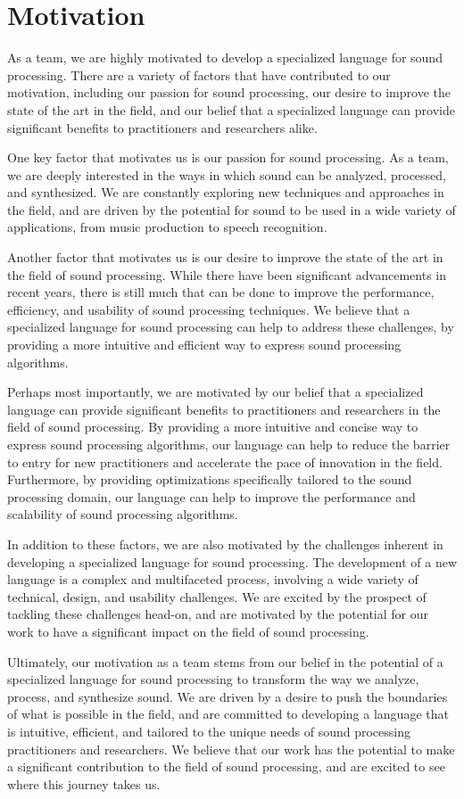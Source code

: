 \section{Motivation} 
As a team, we are highly motivated to develop a specialized language for sound processing. There are a variety of factors that have contributed to our motivation, including our passion for sound processing, our desire to improve the state of the art in the field, and our belief that a specialized language can provide significant benefits to practitioners and researchers alike.

One key factor that motivates us is our passion for sound processing. As a team, we are deeply interested in the ways in which sound can be analyzed, processed, and synthesized. We are constantly exploring new techniques and approaches in the field, and are driven by the potential for sound to be used in a wide variety of applications, from music production to speech recognition.

Another factor that motivates us is our desire to improve the state of the art in the field of sound processing. While there have been significant advancements in recent years, there is still much that can be done to improve the performance, efficiency, and usability of sound processing techniques. We believe that a specialized language for sound processing can help to address these challenges, by providing a more intuitive and efficient way to express sound processing algorithms.

Perhaps most importantly, we are motivated by our belief that a specialized language can provide significant benefits to practitioners and researchers in the field of sound processing. By providing a more intuitive and concise way to express sound processing algorithms, our language can help to reduce the barrier to entry for new practitioners and accelerate the pace of innovation in the field. Furthermore, by providing optimizations specifically tailored to the sound processing domain, our language can help to improve the performance and scalability of sound processing algorithms.

In addition to these factors, we are also motivated by the challenges inherent in developing a specialized language for sound processing. The development of a new language is a complex and multifaceted process, involving a wide variety of technical, design, and usability challenges. We are excited by the prospect of tackling these challenges head-on, and are motivated by the potential for our work to have a significant impact on the field of sound processing.

Ultimately, our motivation as a team stems from our belief in the potential of a specialized language for sound processing to transform the way we analyze, process, and synthesize sound. We are driven by a desire to push the boundaries of what is possible in the field, and are committed to developing a language that is intuitive, efficient, and tailored to the unique needs of sound processing practitioners and researchers. We believe that our work has the potential to make a significant contribution to the field of sound processing, and are excited to see where this journey takes us.